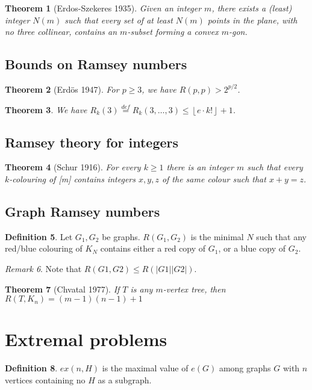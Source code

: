\documentclass[10pt, fleqn, a4paper, landscape]{article}
\theoremstyle{plain} %
\newtheorem{thm}{Theorem}
\theoremstyle{remark} %
\newtheorem{rem}[thm]{Remark}
\theoremstyle{definition} %
\newtheorem{defi}[thm]{Definition}
\begin{document}
\begin{multicols}{3}
\begin{tiny}
\begin{thm}[Erdos-Szekeres 1935]
Given an integer $m$, there exists a (least) integer $N(m)$ such
that every set of at least $N(m)$ points in the plane, with no three collinear, contains an $m$-subset forming a convex $m$-gon.
\end{thm}
\subsection{Bounds on Ramsey numbers}

\begin{thm}[Erdös 1947]
For $p \ge 3$, we have $R(p, p) > 2^{p/2}$.
\end{thm}

\begin{thm}
We have $R_k(3)\stackrel{def}{=}R_k(3,\dots,3)\le\left\lfloor e\cdot k!\right\rfloor+1$.
\end{thm}

\subsection{Ramsey theory for integers}

\begin{thm}[Schur 1916]
For every $k \ge 1$ there is an integer $m$ such that every $k$-colouring of [m] contains integers $x, y, z$ of the same colour such that $x + y = z.$
\end{thm}

\subsection{Graph Ramsey numbers}
\begin{defi}
Let $G_1,G_2$ be graphs. $R(G_1,G_2)$ is the minimal $N$ such that any red/blue colouring of $K_N$ contains either a red copy of $G_1$, or a blue copy of $G_2$.
\end{defi}

\begin{rem}
Note that $R(G1,G2) \le R(|G1||G2|)$.
\end{rem}

\begin{thm}[Chvatal 1977]
If $T$ is any $m$-vertex tree, then $R(T,K_n) = (m - 1)(n - 1) + 1$
\end{thm}

\section{Extremal problems}
\addtocounter{thm}{1}
\begin{defi}
$ex(n,H)$ is the maximal value of $e(G)$ among graphs $G$ with $n$ vertices containing no $H$ as a subgraph.
\end{defi}
\addtocounter{thm}{1}

\end{tiny}
\end{multicols}
\end{document}

